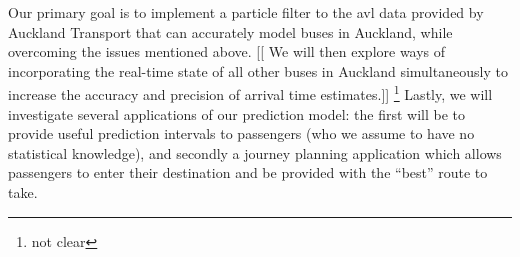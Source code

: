 \documentclass[12pt,a4paper]{article}
\newcommand{\pf}{particle filter}
\begin{document}
Our primary goal is to implement a \pf{} to the \gls{avl} data provided by Auckland Transport
that can accurately model buses in Auckland,
while overcoming the issues mentioned above.
[[ We will then explore ways of incorporating the real-time state of all other buses in Auckland
simultaneously to increase the accuracy and precision of arrival time estimates.]]%
\footnote{not clear}
Lastly, we will investigate several applications of our prediction model:
the first will be to provide useful prediction intervals to passengers
(who we assume to have no statistical knowledge),
and secondly a journey planning application which allows passengers to enter their destination
and be provided with the ``best'' route to take.














\end{document}
